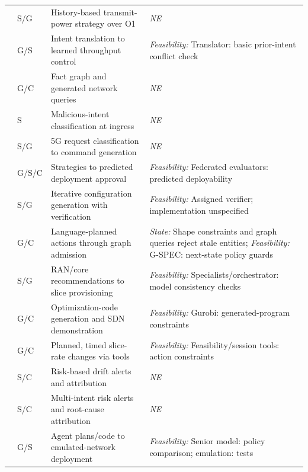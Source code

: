 \begin{longtable}{>{\raggedright\arraybackslash}p{.09\soklitwidth}>{\centering\arraybackslash}p{.07\soklitwidth}>{\raggedright\arraybackslash}p{.36\soklitwidth}>{\raggedright\arraybackslash}p{.48\soklitwidth}}
\addlinespace[1pt]
\cite{e0arxiv250714230} & S/G & History-based transmit-power strategy over O1 & \textit{NE} \\
\addlinespace[1pt]
\cite{e0arxiv250921026} & G/S & Intent translation to learned throughput control & \emph{Feasibility:} Translator: basic prior-intent conflict check \\
\addlinespace[1pt]
\cite{e0arxiv251021894} & G/C & Fact graph and generated network queries & \textit{NE} \\
\addlinespace[1pt]
\cite{e0arxiv251105133} & S & Malicious-intent classification at ingress & \textit{NE} \\
\addlinespace[1pt]
\cite{e0arxiv251121084} & S/G & 5G request classification to command generation & \textit{NE} \\
\addlinespace[1pt]
\cite{e0arxiv251220627} & G/S/C & Strategies to predicted deployment approval & \emph{Feasibility:} Federated evaluators: predicted deployability \\
\addlinespace[1pt]
\cite{lira2025network} & S/G & Iterative configuration generation with verification & \emph{Feasibility:} Assigned verifier; implementation unspecified \\
\addlinespace[1pt]
\cite{e0arxiv251220275} & G/C & Language-planned actions through graph admission & \emph{State:} Shape constraints and graph queries reject stale entities; \emph{Feasibility:} G-SPEC: next-state policy guards \\
\addlinespace[1pt]
\cite{e0arxiv260106640} & S/G & RAN/core recommendations to slice provisioning & \emph{Feasibility:} Specialists/orchestrator: model consistency checks \\
\addlinespace[1pt]
\cite{e0arxiv260112744} & G/C & Optimization-code generation and SDN demonstration & \emph{Feasibility:} Gurobi: generated-program constraints \\
\addlinespace[1pt]
\cite{e0arxiv260113114} & G/C & Planned, timed slice-rate changes via tools & \emph{Feasibility:} Feasibility/session tools: action constraints \\
\addlinespace[1pt]
\cite{e0arxiv260213672} & S/C & Risk-based drift alerts and attribution & \textit{NE} \\
\addlinespace[1pt]
\cite{e0arxiv260214283} & S/C & Multi-intent risk alerts and root-cause attribution & \textit{NE} \\
\addlinespace[1pt]
\cite{e0arxiv260306647} & G/S & Agent plans/code to emulated-network deployment & \emph{Feasibility:} Senior model: policy comparison; emulation: tests \\

\end{longtable}
